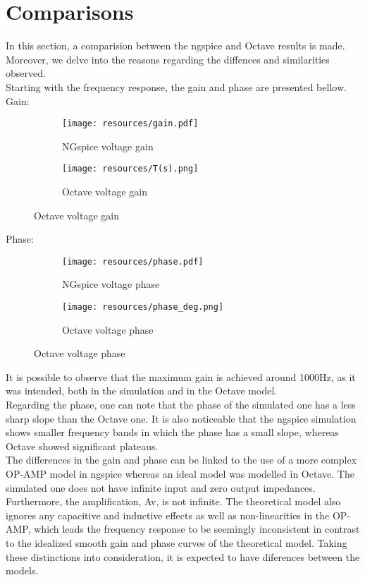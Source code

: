 \section{Comparisons}
\label{sec:comparsisons}

In this section, a comparision between the ngspice and Octave results is made. Moreover, we delve into the reasons regarding the diffences and similarities observed.\\
Starting with the frequency response, the gain and phase are presented bellow.\\
\FloatBarrier
Gain:
\begin{figure} [htb] 
	\begin{subfigure}[b]{0.5\textwidth}
		\centering
  		\texttt{[image: resources/gain.pdf]}
  		\caption{NGspice voltage gain}
	\end{subfigure}
  	\begin{subfigure}[b]{0.5\textwidth}
  		\centering
 		 \texttt{[image: resources/T(s).png]}
 		 \caption{Octave voltage gain}
  	\end{subfigure}
\end{figure}
\FloatBarrier
Phase:
\begin{figure} [htb] 
	\begin{subfigure}[b]{0.5\textwidth}
 		 \texttt{[image: resources/phase.pdf]}
  		\caption{NGspice voltage phase}
 		\label{fig:theoplots}
	\end{subfigure}
  	\begin{subfigure}[b]{0.5\textwidth}
  		\texttt{[image: resources/phase\_deg.png]}
 		 \caption{Octave voltage phase}
 		 \label{fig:theoplots}
  	\end{subfigure}
\end{figure}
\FloatBarrier
It is possible to observe that the maximum gain is achieved around 1000Hz, as it was intended, both in the simulation and in the Octave model.\\
Regarding the phase, one can note that the phase of the simulated one has a less sharp slope than the Octave one. It is also noticeable that the ngspice simulation shows smaller frequency bands in which the phase has a small slope, whereas Octave showed significant plateaus.\\
The differences in the gain and phase can be linked to the use of a more complex OP-AMP model in ngspice whereas an ideal model was modelled in Octave. The simulated one does not have infinite input and zero output impedances. Furthermore, the amplification, Av, is not infinite. The theoretical model also ignores any capacitive and inductive effects as well as non-linearities in the OP-AMP, which leads the frequency response to be seemingly inconsistent in contrast to the idealized smooth gain and phase curves of the theoretical model. Taking these distinctions into consideration, it is expected to have diferences between the models.\\

